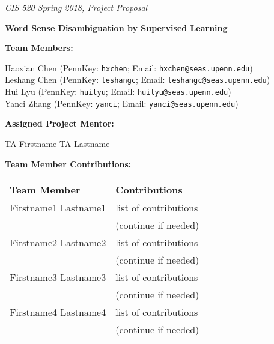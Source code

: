 \documentclass[twoside,11pt]{article}
\renewcommand{\>}{{\rightarrow}}
\newcommand{\1}{{\mathbf 1}}
\newcommand{\0}{{\mathbf 0}}
\begin{document}

\emph{\footnotesize{CIS 520 Spring 2018, Project Proposal}}


\vspace{12pt}

\textbf{\Large{Word Sense Disambiguation by Supervised Learning}}

\vspace{1cm}

\textbf{Team Members:}

Haoxian Chen (PennKey: \texttt{hxchen}; Email: \texttt{hxchen@seas.upenn.edu}) \\
Leshang Chen (PennKey: \texttt{leshangc}; Email: \texttt{leshangc@seas.upenn.edu}) \\
Hui Lyu (PennKey: \texttt{huilyu}; Email: \texttt{huilyu@seas.upenn.edu}) \\
Yanci Zhang (PennKey: \texttt{yanci}; Email: \texttt{yanci@seas.upenn.edu})


\vspace{2cm}


\textbf{Assigned Project Mentor:}

TA-Firstname TA-Lastname

\vspace{1cm}

\textbf{Team Member Contributions:}

\begin{center}
\begin{tabular}{|l|l|}
\hline
Team Member & Contributions \\
\hline
Firstname1 Lastname1 & list of contributions \\
	& (continue if needed) \\
\hline
Firstname2 Lastname2 & list of contributions \\
	& (continue if needed) \\
\hline
Firstname3 Lastname3 & list of contributions \\
	& (continue if needed) \\
\hline
Firstname4 Lastname4 & list of contributions \\
	& (continue if needed) \\
\hline
\end{tabular}
\end{center}
\end{document}
